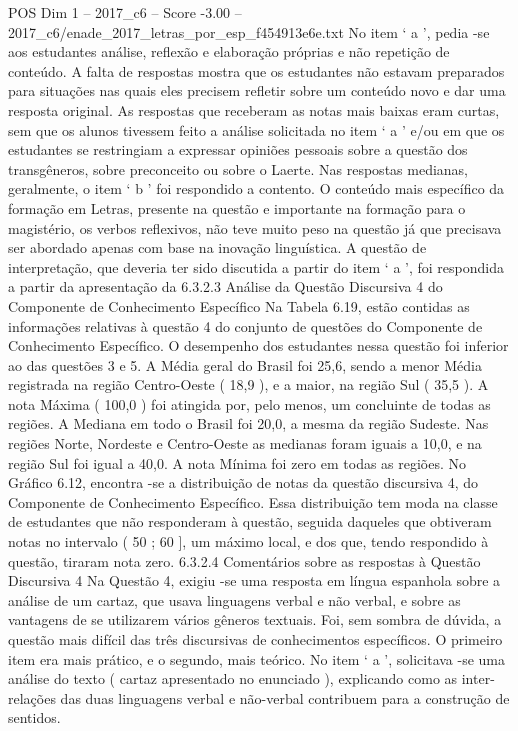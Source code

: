 \begin{textsample}{POS Dim 1 – 2017\_c6 – Score -3.00 – 2017\_c6/enade\_2017\_letras\_por\_esp\_f454913e6e.txt}
No item ‘ a ’, pedia -se aos estudantes análise, reflexão e elaboração próprias e não repetição de conteúdo.
A falta de respostas mostra que os estudantes não estavam preparados para situações nas quais eles precisem refletir sobre um conteúdo novo e dar uma resposta original.
As respostas que receberam as notas mais baixas eram curtas, sem que os alunos tivessem feito a análise solicitada no item ‘ a ’ e/ou em que os estudantes se restringiam a expressar opiniões pessoais sobre a questão dos transgêneros, sobre preconceito ou sobre o Laerte.
Nas respostas medianas, geralmente, o item ‘ b ’ foi respondido a contento.
O conteúdo mais específico da formação em Letras, presente na questão e importante na formação para o magistério, os verbos reflexivos, não teve muito peso na questão já que precisava ser abordado apenas com base na inovação linguística.
A questão de interpretação, que deveria ter sido discutida a partir do item ‘ a ’, foi respondida a partir da apresentação da 6.3.2.3 Análise da Questão Discursiva 4 do Componente de Conhecimento Específico Na Tabela 6.19, estão contidas as informações relativas à questão 4 do conjunto de questões do Componente de Conhecimento Específico.
O desempenho dos estudantes nessa questão foi inferior ao das questões 3 e 5.
A Média geral do Brasil foi 25,6, sendo a menor Média registrada na região Centro-Oeste ( 18,9 ), e a maior, na região Sul ( 35,5 ).
A nota Máxima ( 100,0 ) foi atingida por, pelo menos, um concluinte de todas as regiões.
A Mediana em todo o Brasil foi 20,0, a mesma da região Sudeste.
Nas regiões Norte, Nordeste e Centro-Oeste as medianas foram iguais a 10,0, e na região Sul foi igual a 40,0.
A nota Mínima foi zero em todas as regiões.
No Gráfico 6.12, encontra -se a distribuição de notas da questão discursiva 4, do Componente de Conhecimento Específico.
Essa distribuição tem moda na classe de estudantes que não responderam à questão, seguida daqueles que obtiveram notas no intervalo ( 50 ; 60 ], um máximo local, e dos que, tendo respondido à questão, tiraram nota zero. 6.3.2.4 Comentários sobre as respostas à Questão Discursiva 4 Na Questão 4, exigiu -se uma resposta em língua espanhola sobre a análise de um cartaz, que usava linguagens verbal e não verbal, e sobre as vantagens de se utilizarem vários gêneros textuais.
Foi, sem sombra de dúvida, a questão mais difícil das três discursivas de conhecimentos específicos.
O primeiro item era mais prático, e o segundo, mais teórico.
No item ‘ a ’, solicitava -se uma análise do texto ( cartaz apresentado no enunciado ), explicando como as inter-relações das duas linguagens verbal e não-verbal contribuem para a construção de sentidos.

\end{textsample}

